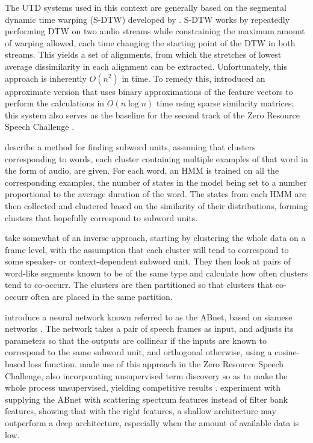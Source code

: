 The UTD systems used in this context are generally based on the segmental dynamic time warping (S-DTW) developed by \textcite{park2008unsupervised}.
S-DTW works by repeatedly performing DTW on two audio streams while constraining the maximum amount of warping allowed, each time changing the starting point of the DTW in both streams.
This yields a set of alignments, from which the stretches of lowest average dissimilarity in each alignment can be extracted.
Unfortunately, this approach is inherently $O(n^2)$ in time.
To remedy this, \textcite{jansen2011efficient} introduced an approximate version that uses binary approximations of the feature vectors to perform the calculations in $O(n \log n)$ time using sparse similarity matrices; this system also serves as the baseline for the second track of the Zero Resource Speech Challenge \parencite{versteegh2015zero}.

\textcite{jansen2011towards} describe a method for finding subword units, assuming that clusters corresponding to words, each cluster containing multiple examples of that word in the form of audio, are given.
For each word, an HMM is trained on all the corresponding examples, the number of states in the model being set to a number proportional to the average duration of the word.
The states from each HMM are then collected and clustered based on the similarity of their distributions, forming clusters that hopefully correspond to subword units.

\textcite{jansen2013weak} take somewhat of an inverse approach, starting by clustering the whole data on a frame level, with the assumption that each cluster will tend to correspond to some speaker- or context-dependent subword unit.
They then look at pairs of word-like segments known to be of the same type and calculate how often clusters tend to co-occurr.
The clusters are then partitioned so that clusters that co-occurr often are placed in the same partition.

\textcite{synnaeve2014phonetics} introduce a neural network known referred to as the ABnet, based on siamese networks \parencite{bromley1994signature}.
The network takes a pair of speech frames as input, and adjusts its parameters so that the outputs are collinear if the inputs are known to correspond to the same subword unit, and orthogonal otherwise, using a cosine-based loss function.
\textcite{thiolliere2015hybrid} made use of this approach in the Zero Resource Speech Challenge, also incorporating unsupervised term discovery so as to make the whole process unsupervised, yielding competitive results \parencite{versteegh2016zero}.
\textcite{zeghidour2016deep} experiment with supplying the ABnet with scattering spectrum features instead of filter bank features, showing that with the right features, a shallow architecture may outperform a deep architecture, especially when the amount of available data is low.

